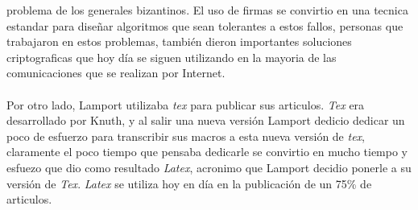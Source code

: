 \documentclass{article}
\begin{document}
\begin{enumerate}
{      problema de los generales bizantinos. El uso de firmas se convirtio en 
      una tecnica estandar para diseñar algoritmos que sean tolerantes a estos
      fallos, personas que trabajaron en estos problemas, también dieron 
      importantes soluciones criptograficas que hoy día se siguen utilizando
      en la mayoria de las comunicaciones que se realizan por Internet.\\
      \\Por otro lado, Lamport utilizaba \textit{tex} para publicar sus 
      articulos. \textit{Tex} era desarrollado por Knuth, y al salir una nueva
      versión Lamport dedicio dedicar un poco de esfuerzo para transcribir 
      sus macros a esta nueva versión de \textit{tex}, claramente el poco
      tiempo que pensaba dedicarle se convirtio en mucho tiempo y esfuezo
      que dio como resultado \textit{Latex}, acronimo que Lamport decidio
      ponerle a su versión de \textit{Tex}. \textit{Latex} se utiliza hoy
      en día en la publicación de un 75\% de articulos.
      
      
    }

\end{enumerate}
\end{document}
